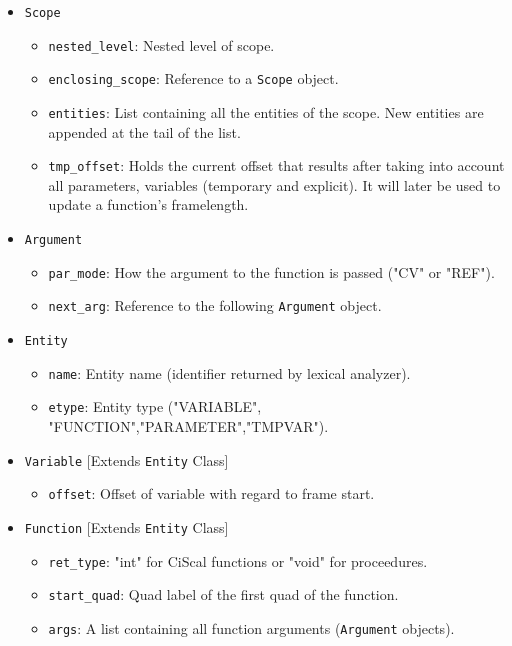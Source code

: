 \documentclass{article}
\def\code#1{\texttt{#1}} %
\begin{document}
\begin{itemize}
 \item \code{Scope}
    \begin{itemize}
    \item \code{nested\_level}: Nested level of scope.
    \item \code{enclosing\_scope}: Reference to a \code{Scope} object.
    \item \code{entities}: List containing all the entities of the scope. New entities
                           are appended at the tail of the list.
    \item \code{tmp\_offset}: Holds the current offset that results after taking into account all parameters,
                              variables (temporary and explicit). It will later be used to update a function's framelength.
    \end{itemize}
  \item \code{Argument}
    \begin{itemize}
    \item \code{par\_mode}: How the argument to the function is passed ("CV" or "REF").
    \item \code{next\_arg}: Reference to the following \code{Argument} object.
    \end{itemize}
  \item \code{Entity}
    \begin{itemize}
    \item \code{name}: Entity name (identifier returned by lexical analyzer).
    \item \code{etype}: Entity type ("VARIABLE", "FUNCTION","PARAMETER","TMPVAR").
    \end{itemize}
  \item \code{Variable} [Extends \code{Entity} Class]
    \begin{itemize}
    \item \code{offset}: Offset of variable with regard to frame start.
    \end{itemize}
  \item \code{Function} [Extends \code{Entity} Class]
    \begin{itemize}
    \item \code{ret\_type}: "int" for CiScal functions or "void" for proceedures.
    \item \code{start\_quad}: Quad label of the first quad of the function.
    \item \code{args}: A list containing all function arguments (\code{Argument} objects).

\end{itemize}
\end{itemize}
\end{document}
